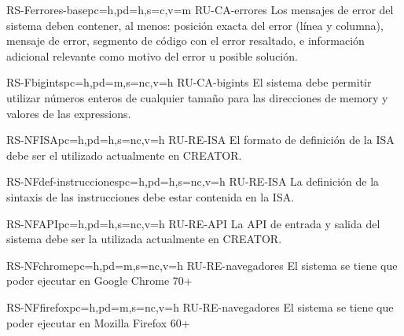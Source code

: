 \begin{softwareReq}{RS-F}{errores-base}{pc=h,pd=h,s=c,v=m}
    {RU-CA-errores}
    Los mensajes de error del sistema deben contener, al menos: posición exacta
    del error (línea y columna), mensaje de error, segmento de código con el
    error resaltado, e información adicional relevante como motivo del error u
    posible solución.
\end{softwareReq}


\begin{softwareReq}{RS-F}{bigints}{pc=h,pd=m,s=nc,v=h}
    {RU-CA-bigints}
    El sistema debe permitir utilizar números enteros de cualquier tamaño para
    las direcciones de \gls{memory} y valores de las \glspl{expression}.
\end{softwareReq}


\begin{softwareReq}{RS-NF}{ISA}{pc=h,pd=h,s=nc,v=h}
    {RU-RE-ISA}
    El formato de definición de la \gls{ISA} debe ser el utilizado
    actualmente en CREATOR.
\end{softwareReq}

\begin{softwareReq}{RS-NF}{def-instrucciones}{pc=h,pd=h,s=nc,v=h}
    {RU-RE-ISA}
    La definición de la sintaxis de las instrucciones debe estar contenida en la
    \gls{ISA}.
\end{softwareReq}

\begin{softwareReq}{RS-NF}{API}{pc=h,pd=h,s=nc,v=h}
    {RU-RE-API}
    La \gls{API} de entrada y salida del sistema debe ser la utilizada
    actualmente en CREATOR.
\end{softwareReq}

\begin{softwareReq}{RS-NF}{chrome}{pc=h,pd=m,s=nc,v=h}
    {RU-RE-navegadores}
    El sistema se tiene que poder ejecutar en Google Chrome 70+
\end{softwareReq}

\begin{softwareReq}{RS-NF}{firefox}{pc=h,pd=m,s=nc,v=h}
    {RU-RE-navegadores}
    El sistema se tiene que poder ejecutar en Mozilla Firefox 60+
\end{softwareReq}

